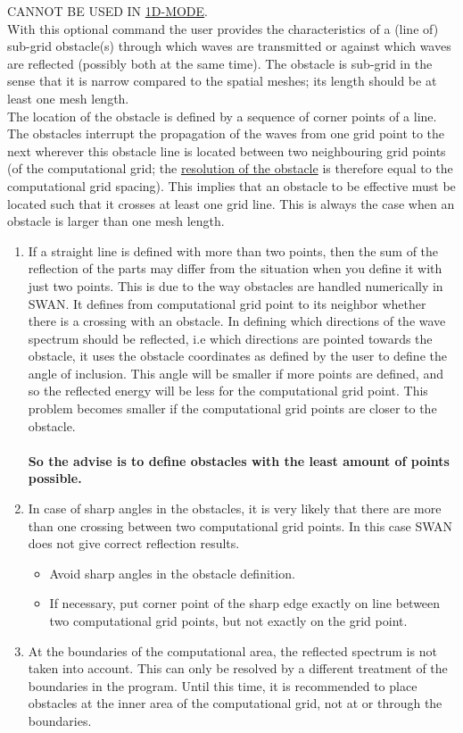 \documentclass[12pt]{book}
\begin{document}
\noindent
CANNOT BE USED IN \underline{1D-MODE}.
\\[2ex]
\noindent
With this optional command the user provides the characteristics of a (line of) sub-grid obstacle(s)
through which waves are transmitted or against which waves are reflected (possibly both at the same
time). The obstacle is sub-grid in the sense that it is narrow
compared to the spatial meshes; its length should be at least one mesh length.
\\[2ex]
\noindent
The location of the obstacle is defined by a sequence of corner points of a line. The obstacles interrupt
the propagation of the waves from one grid point to the next wherever this obstacle line is located between
two neighbouring grid points (of the computational grid; the \underline{resolution of the obstacle} is therefore equal
to the computational grid spacing). This implies that an obstacle to be effective must be located such that
it crosses at least one grid line. This is always the case when an obstacle is larger than one mesh
length.
\begin{enumerate}
\item If a straight line is defined with more than two points, then the sum of the reflection of the parts
      may differ from the situation when you define it with just two points. This is due to the way
      obstacles are handled numerically in SWAN. It defines from computational grid point to its
      neighbor whether there is a crossing with an obstacle. In defining which directions of the wave
      spectrum should be reflected, i.e which directions are pointed towards the obstacle,  it uses the
      obstacle coordinates as defined by the user to define the angle of inclusion. This angle will be
      smaller if more points are defined, and so the reflected energy will be less for the computational
      grid point. This problem becomes smaller if the computational grid points are closer to the
      obstacle.\\
      \\
      {\bf So the advise is to define obstacles with the least amount of points possible.}
\item In case of sharp angles in the obstacles, it is very likely that there are more than one crossing
      between two computational grid points. In this case SWAN does not give correct reflection
      results.
      \begin{itemize}
         \item Avoid sharp angles in the obstacle definition.
         \item If necessary, put corner point of the sharp edge exactly on line between two computational grid points,
               but not exactly on the grid point.
      \end{itemize}
\item At the boundaries of the computational area, the reflected spectrum is not taken into account.
      This can only be resolved by a different treatment of the boundaries in the program. Until this
      time, it is recommended to place obstacles at the inner area of the computational grid, not at or
      through the boundaries.
\end{enumerate}
\end{document}
